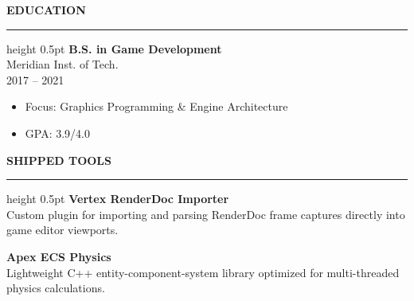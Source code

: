 \documentclass[10pt]{article}
\begin{document}
\begin{minipage}[t]{0.34\textwidth}
    \vspace{8pt}
    
    \begin{tcolorbox}
        {\large\bfseries\textcolor{primary}{EDUCATION}}
        \vspace{2pt}
        \hrule height 0.5pt\relax
        \vspace{6pt}
        \textbf{B.S. in Game Development}\\
        \textcolor{textdark}{Meridian Inst. of Tech.}\\
        \textcolor{textlight}{\small 2017 -- 2021}
        \begin{itemize}[leftmargin=8pt, label=\textcolor{accent}{\tiny$\circ$}, noitemsep, topsep=1pt]
            \item Focus: Graphics Programming \& Engine Architecture
            \item GPA: 3.9/4.0
        \end{itemize}
    \end{tcolorbox}
    
    \vspace{8pt}
    
    \begin{tcolorbox}
        {\large\bfseries\textcolor{primary}{SHIPPED TOOLS}}
        \vspace{2pt}
        \hrule height 0.5pt\relax
        \vspace{6pt}
        \textbf{Vertex RenderDoc Importer} \\
        Custom plugin for importing and parsing RenderDoc frame captures directly into game editor viewports.
        
        \vspace{4pt}
        \textbf{Apex ECS Physics} \\
        Lightweight C++ entity-component-system library optimized for multi-threaded physics calculations.
    \end{tcolorbox}
\end{minipage}
\end{document}
